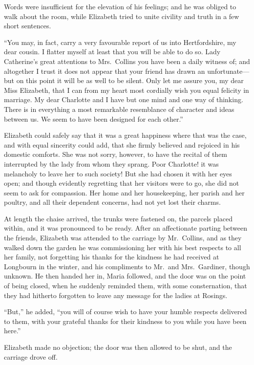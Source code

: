\documentclass[12pt,english,oneside]{book}
\begin{document}
Words were insufficient for the elevation of his feelings; and he
was obliged to walk about the room, while Elizabeth tried to unite
civility and truth in a few short sentences.

{}``You may, in fact, carry a very favourable report of us into Hertfordshire,
my dear cousin. I flatter myself at least that you will be able to
do so. Lady Catherine's great attentions to Mrs.\ Collins you have
been a daily witness of; and altogether I trust it does not appear
that your friend has drawn an unfortunate\mbox{---}but on this point
it will be as well to be silent. Only let me assure you, my dear Miss
Elizabeth, that I can from my heart most cordially wish you equal
felicity in marriage. My dear Charlotte and I have but one mind and
one way of thinking. There is in everything a most remarkable resemblance
of character and ideas between us. We seem to have been designed for
each other.''

Elizabeth could safely say that it was a great happiness where that
was the case, and with equal sincerity could add, that she firmly
believed and rejoiced in his domestic comforts. She was not sorry,
however, to have the recital of them interrupted by the lady from
whom they sprang. Poor Charlotte! it was melancholy to leave her to
such society! But she had chosen it with her eyes open; and though
evidently regretting that her visitors were to go, she did not seem
to ask for compassion. Her home and her housekeeping, her parish and
her poultry, and all their dependent concerns, had not yet lost their
charms.

At length the chaise arrived, the trunks were fastened on, the parcels
placed within, and it was pronounced to be ready. After an affectionate
parting between the friends, Elizabeth was attended to the carriage
by Mr.\ Collins, and as they walked down the garden he was commissioning
her with his best respects to all her family, not forgetting his thanks
for the kindness he had received at Longbourn in the winter, and his
compliments to Mr.\ and Mrs.\ Gardiner, though unknown. He then
handed her in, Maria followed, and the door was on the point of being
closed, when he suddenly reminded them, with some consternation, that
they had hitherto forgotten to leave any message for the ladies at
Rosings.

{}``But,'' he added, {}``you will of course wish to have your humble
respects delivered to them, with your grateful thanks for their kindness
to you while you have been here.''

Elizabeth made no objection; the door was then allowed to be shut,
and the carriage drove off.
\end{document}
